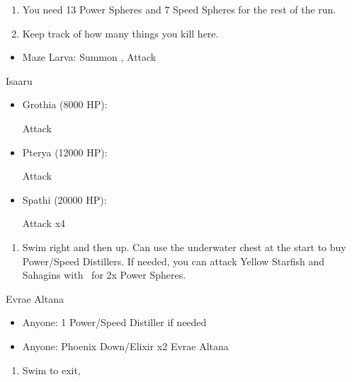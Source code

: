 \begin{enumerate}[resume]
	\item You need 13 Power Spheres and 7 Speed Spheres for the rest of the run.
	\item Keep track of how many things you kill here.
\end{enumerate}
\begin{encounters}
	\begin{itemize}
		\item Maze Larva: Summon \ixion, Attack
	\end{itemize}
\end{encounters}
\bothvfill
\winvfill
\lossvfill
\begin{battle}{Isaaru}
	\begin{itemize}
		\item Grothia (8000 HP):
		      \begin{itemize}
			      \summon{\bahamut}
			      \bahamutf Attack
		      \end{itemize}
		\item Pterya (12000 HP):
		      \begin{itemize}
			      \summon{\bahamut}
			      \bahamutf Attack
		      \end{itemize}
		\item Spathi (20000 HP):
		      \begin{itemize}
			      \summon{\ixion}
			      \ixionf Attack x4
		      \end{itemize}
	\end{itemize}
\end{battle}
\begin{enumerate}[resume]
	\item Swim right and then up. Can use the underwater chest at the start to buy Power/Speed Distillers. If needed, you can attack Yellow Starfish and Sahagins with \tidus\ for 2x Power Spheres.
\end{enumerate}
\begin{battle}{Evrae Altana}
	\begin{itemize}
		\item Anyone: 1 Power/Speed Distiller if needed
		\item Anyone: Phoenix Down/Elixir x2 Evrae Altana
	\end{itemize}
\end{battle}
\begin{enumerate}[resume]
	\item Swim to exit, \sd
\end{enumerate}
\ 
\bothvfill
\ \bothnewline
\bothcb
\ 